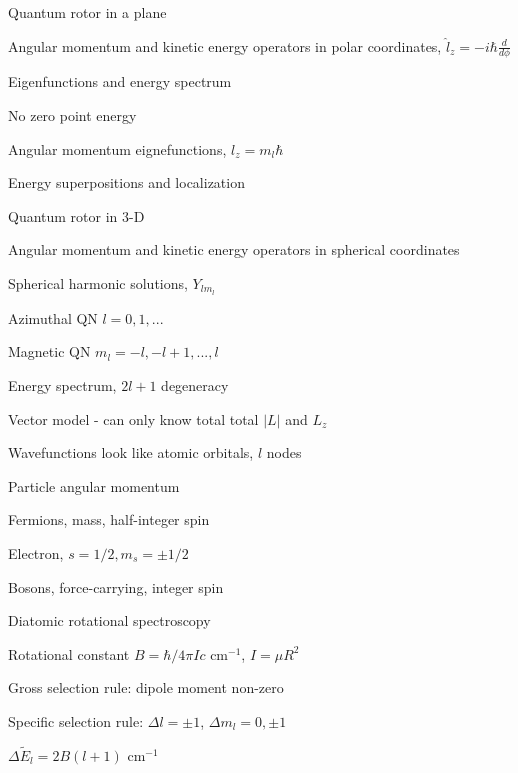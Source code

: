 \message{ !name(Outline.tex)}\documentclass[11pt]{article}
\begin{document}
\begin{outline}
\begin{outline}
  \item Quantum rotor in a plane
    \begin{outline}
    \item Angular momentum and kinetic energy operators in polar coordinates,
      $\hat l_z = -i\hbar \frac{d}{d\phi}$
    \item Eigenfunctions and energy spectrum
    \item No zero point energy
    \item Angular momentum eignefunctions, $l_z = m_l \hbar$
      \item Energy superpositions and localization 
    \end{outline}
  \item Quantum rotor in 3-D
    \begin{outline}
    \item Angular momentum and kinetic energy operators in spherical coordinates
    \item Spherical harmonic solutions, $Y_{lm_l}$
    \item Azimuthal QN $l=0, 1, ...$
    \item Magnetic QN $m_l = -l, -l+1, ..., l$
    \item Energy spectrum, $2 l + 1$ degeneracy
    \item Vector model - can only know total total $|L|$ and $L_z$
    \item Wavefunctions look like atomic orbitals, $l$ nodes
    \end{outline}
  \item Particle angular momentum
    \begin{outline}
    \item Fermions, mass, half-integer spin
      \begin{outline}
      \item Electron, $s=1/2, m_s=\pm 1/2$
      \end{outline}
    \item Bosons, force-carrying, integer spin
    \end{outline}
  \item{Diatomic rotational spectroscopy}
    \begin{outline}
    \item Rotational constant $B = \hbar/4\pi I c$ cm$^{-1}$, $I=\mu R^2$
    \item Gross selection rule: dipole moment non-zero
    \item Specific selection rule: $\Delta l=\pm 1$, $\Delta m_l=0, \pm1$
    \item $\Delta \tilde E_l  = 2B(l+1)$ cm$^{-1}$

\end{outline}
\end{outline}
\end{outline}
\end{document}
